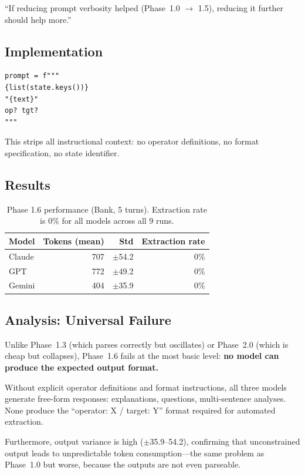 \documentclass[11pt,a4paper]{article}
\begin{document}
``If reducing prompt verbosity helped (Phase~1.0 $\rightarrow$ 1.5), reducing it
further should help more.''

\subsection{Implementation}

\begin{lstlisting}
prompt = f"""
{list(state.keys())}
"{text}"
op? tgt?
"""
\end{lstlisting}

This strips all instructional context: no operator definitions, no format
specification, no state identifier.

\subsection{Results}

\begin{table}[ht]
\centering
\begin{tabular}{lrrr}
\toprule
\textbf{Model} & \textbf{Tokens (mean)} & \textbf{Std} & \textbf{Extraction rate} \\
\midrule
Claude & 707 & $\pm$54.2 & 0\% \\
GPT & 772 & $\pm$49.2 & 0\% \\
Gemini & 404 & $\pm$35.9 & 0\% \\
\bottomrule
\end{tabular}
\caption{Phase 1.6 performance (Bank, 5 turns). Extraction rate is 0\% for
all models across all 9 runs.}
\label{tab:phase1_6}
\end{table}

\subsection{Analysis: Universal Failure}

Unlike Phase~1.3 (which parses correctly but oscillates) or Phase~2.0
(which is cheap but collapses), Phase~1.6 fails at the most basic level:
\textbf{no model can produce the expected output format.}

Without explicit operator definitions and format instructions, all three models
generate free-form responses: explanations, questions, multi-sentence analyses.
None produce the ``operator: X / target: Y'' format required for automated
extraction.

Furthermore, output variance is high ($\pm$35.9--54.2), confirming that
unconstrained output leads to unpredictable token consumption---the same problem
as Phase~1.0 but worse, because the outputs are not even parseable.
\end{document}

